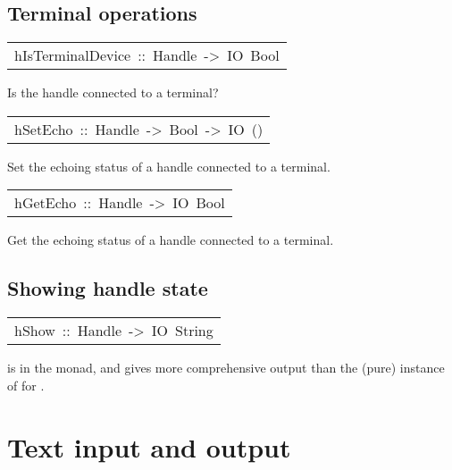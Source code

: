 \subsection{Terminal operations
}
\begin{haddockdesc}
\item[\begin{tabular}{@{}l}
hIsTerminalDevice\ ::\ Handle\ ->\ IO\ Bool
\end{tabular}]\haddockbegindoc
Is the handle connected to a terminal?
\par

\end{haddockdesc}
\begin{haddockdesc}
\item[\begin{tabular}{@{}l}
hSetEcho\ ::\ Handle\ ->\ Bool\ ->\ IO\ ()
\end{tabular}]\haddockbegindoc
Set the echoing status of a handle connected to a terminal.
\par

\end{haddockdesc}
\begin{haddockdesc}
\item[\begin{tabular}{@{}l}
hGetEcho\ ::\ Handle\ ->\ IO\ Bool
\end{tabular}]\haddockbegindoc
Get the echoing status of a handle connected to a terminal.
\par

\end{haddockdesc}
\subsection{Showing handle state
}
\begin{haddockdesc}
\item[\begin{tabular}{@{}l}
hShow\ ::\ Handle\ ->\ IO\ String
\end{tabular}]\haddockbegindoc
{} is in the  monad, and gives more comprehensive output
 than the (pure) instance of  for .
\par

\end{haddockdesc}
\section{Text input and output
}
